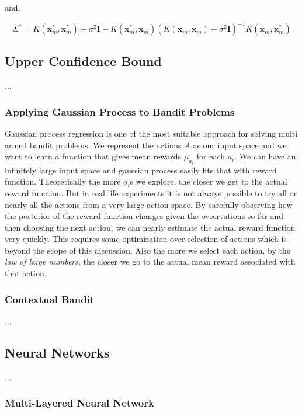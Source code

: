 \documentclass[english]{tktltiki}
\begin{document}
and,

\begin{equation}
\Sigma^* = K(\mathbf{x}_m^*, \mathbf{x}_m^*) + \sigma^2 \mathbf{I} - K(\mathbf{x}_m^*, \mathbf{x}_m)(K(\mathbf{x}_m, \mathbf{x}_m) + \sigma^2 \mathbf{I})^{-1} K(\mathbf{x}_m, \mathbf{x}_m^*)
\end{equation}

\subsection{Upper Confidence Bound}

...

\subsubsection{Applying Gaussian Process to Bandit Problems}

Gaussian process regression is one of the most suitable approach for solving multi armed bandit problems. We represent the actions $A$ as our input space and we want to learn a function that gives mean rewards $\mu_{a_i}$ for each $a_i$. We can have an infinitely large input space and gaussian process easily fits that with reward function. Theoretically the more $a_i$s we explore, the closer we get to the actual reward function. But in real life experiments it is not always possible to try all or nearly all the actions from a very large action space. By carefully observing how the posterior of the reward function changes given the ovservations so far and then choosing the next action, we can nearly estimate the actual reward function very quickly. This requires some optimization over selection of actions which is beyond the scope of this discussion. Also the more we select each action, by the \textit{law of large numbers}, the closer we go to the actual mean reward associated with that action.

\subsubsection{Contextual Bandit}

...

\subsection{Neural Networks}

...

\subsubsection{Multi-Layered Neural Network}
\end{document}
